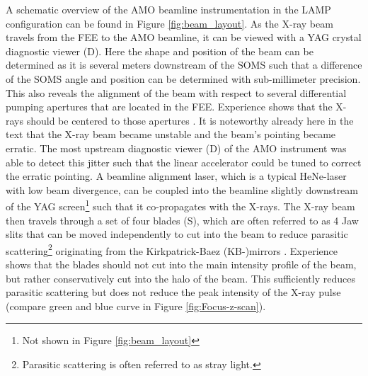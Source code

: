 A schematic overview of the AMO beamline instrumentation in the LAMP configuration can be found in Figure \ref{fig:beam_layout}. As the X-ray beam travels from the FEE to the AMO beamline, it can be viewed with a YAG crystal diagnostic viewer (D). Here the shape and position of the beam can be determined as it is several meters downstream of the SOMS such that a difference of the SOMS angle and position can be determined with sub-millimeter precision. This also reveals the alignment of the beam with respect to several differential pumping apertures that are located in the FEE. Experience shows that the X-rays should be centered to those apertures \citep{Turner-2016-PC}. It is noteworthy already here in the text that the X-ray beam became unstable and the beam's pointing became erratic. The most upstream diagnostic viewer (D) of the AMO instrument was able to detect this jitter such that the linear accelerator could be tuned to correct the erratic pointing. A beamline alignment laser, which is a typical HeNe-laser with low beam divergence, can be coupled into the beamline slightly downstream of the YAG screen\footnote{Not shown in  Figure \ref{fig:beam_layout}} such that it co-propagates with the X-rays. 
The X-ray beam then travels through a set of four blades (S), which are often referred to as 4 Jaw slits that can be moved independently to cut into the beam to reduce parasitic scattering\footnote{Parasitic scattering is often referred to as stray light.} originating from the Kirkpatrick-Baez (KB-)mirrors \citep{Kirkpatrick-1948-JOSA}.
Experience shows that the blades should not cut into the main intensity profile of the beam, but rather conservatively cut into the halo of the beam. This sufficiently reduces parasitic scattering but does not reduce the peak intensity of the X-ray pulse (compare green and blue curve in Figure \ref{fig:Focus-z-scan}).\\[1\baselineskip]
%
